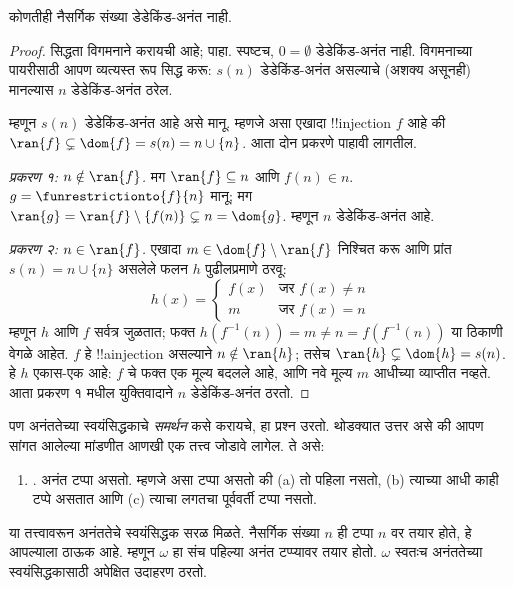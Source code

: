 \documentclass[../../../include/open-logic-section]{subfiles}
\begin{document}
\begin{prop}
कोणतीही नैसर्गिक संख्या डेडेकिंड-अनंत नाही.
\end{prop}

\begin{proof}
सिद्धता विगमनाने करायची आहे;  पाहा. स्पष्टच, $0
= \emptyset$ डेडेकिंड-अनंत नाही. विगमनाच्या पायरीसाठी आपण व्यत्यस्त रूप सिद्ध करू: $s(n)$ डेडेकिंड-अनंत असल्याचे (अशक्य असूनही) मानल्यास $n$ डेडेकिंड-अनंत ठरेल.

म्हणून $s(n)$ डेडेकिंड-अनंत आहे असे मानू. म्हणजे असा एखादा !!{injection} $f$ आहे की $\ran{f}\subsetneq \dom{f} = s(n) = n \cup
\{n\}$. आता दोन प्रकरणे पाहावी लागतील.

\emph{प्रकरण १: $n \notin \ran{f}$.} मग $\ran{f} \subseteq n$ आणि $f(n) \in n$. $g = \funrestrictionto{f}{n}$ मानू; मग $\ran{g} =
\ran{f} \setminus \{f(n)\} \subsetneq n = \dom{g}$. म्हणून $n$ डेडेकिंड-अनंत आहे.

\emph{प्रकरण २: $n \in \ran{f}$.} एखादा $m \in \dom{f} \setminus \ran{f}$ निश्चित करू आणि प्रांत $s(n) = n \cup \{n\}$ असलेले फलन $h$ पुढीलप्रमाणे ठरवू:
\[
h(x) =
	\begin{cases}
		f(x) & \text{जर }f(x) \neq n\\
		m & \text{जर }f(x)=n
	\end{cases}
\]
म्हणून $h$ आणि $f$ सर्वत्र जुळतात; फक्त $h(f^{-1}(n)) = m
\neq n = f(f^{-1}(n))$ या ठिकाणी वेगळे आहेत. $f$ हे !!a{injection} असल्याने $n \notin
\ran{h}$; तसेच $\ran{h} \subsetneq \dom{h} = s(n)$.
हे $h$ एकास-एक आहे: $f$ चे फक्त एक मूल्य बदलले आहे,
आणि नवे मूल्य $m$ आधीच्या व्याप्तीत नव्हते.
आता प्रकरण १ मधील युक्तिवादाने $n$ डेडेकिंड-अनंत ठरतो.
\end{proof}

पण अनंततेच्या स्वयंसिद्धकाचे \emph{समर्थन} कसे करायचे, हा प्रश्न उरतो. थोडक्यात उत्तर असे की आपण सांगत आलेल्या मांडणीत आणखी एक तत्त्व जोडावे लागेल. ते असे:
\begin{enumerate}
\item[] \stagesinf. अनंत टप्पा असतो. म्हणजे असा टप्पा असतो की (a) तो पहिला नसतो, (b) त्याच्या आधी काही टप्पे असतात आणि (c) त्याचा लगतचा पूर्ववर्ती टप्पा नसतो.
\end{enumerate}
या तत्त्वावरून अनंततेचे स्वयंसिद्धक सरळ मिळते. नैसर्गिक संख्या $n$ ही टप्पा $n$ वर तयार होते, हे आपल्याला ठाऊक आहे. म्हणून $\omega$ हा संच पहिल्या अनंत टप्प्यावर तयार होतो. $\omega$ स्वतःच अनंततेच्या स्वयंसिद्धकासाठी अपेक्षित उदाहरण ठरतो.
\end{document}
